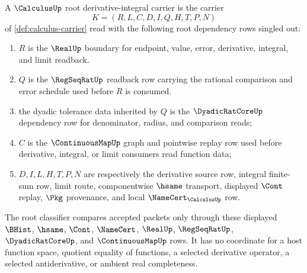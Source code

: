 \begin{definition}
\label{def:calculus-root-derivative-integral-carrier}
A $\CalculusUp$ root derivative-integral carrier is the carrier
$$
K=(R,L,C,D,I,Q,H,T,P,N)
$$
of \autoref{def:calculus-carrier} read with the following root dependency rows singled out:
\begin{enumerate}
\item $R$ is the $\RealUp$ boundary for endpoint, value, error, derivative, integral, and limit readback.
\item $Q$ is the $\RegSeqRatUp$ readback row carrying the rational comparison and error schedule used before $R$ is consumed.
\item the dyadic tolerance data inherited by $Q$ is the $\DyadicRatCoreUp$ dependency row for denominator, radius, and comparison reads;
\item $C$ is the $\ContinuousMapUp$ graph and pointwise replay row used before derivative, integral, or limit consumers read function data;
\item $D,I,L,H,T,P,N$ are respectively the derivative source row, integral finite-sum row, limit route, componentwise $\hsame$ transport, displayed $\Cont$ replay, $\Pkg$ provenance, and local $\NameCert_{\CalculusUp}$ row.
\end{enumerate}
The root classifier compares accepted packets only through these displayed $\BHist$, $\hsame$, $\Cont$, $\NameCert$, $\RealUp$, $\RegSeqRatUp$, $\DyadicRatCoreUp$, and $\ContinuousMapUp$ rows. It has no coordinate for a host function space, quotient equality of functions, a selected derivative operator, a selected antiderivative, or ambient real completeness.
\end{definition}

